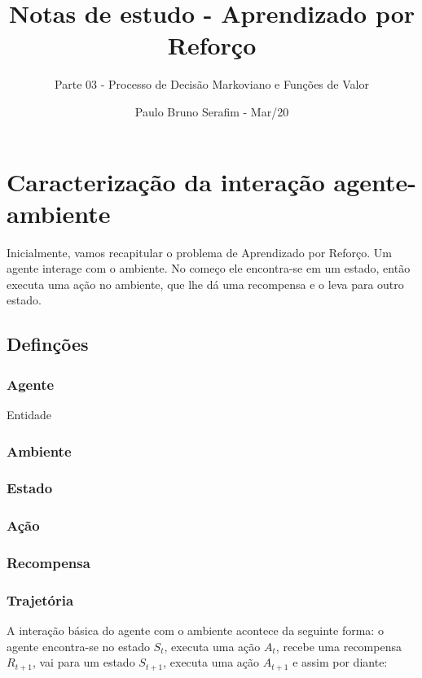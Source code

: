 \documentclass{article}
\title{Notas de estudo - Aprendizado por Reforço}
\author{Parte 03 - Processo de Decisão Markoviano e Funções de Valor}
\date{Paulo Bruno Serafim - Mar/20}
\begin{document}
\maketitle

    \section{Caracterização da interação agente-ambiente}
    
        Inicialmente, vamos recapitular o problema de Aprendizado por Reforço. Um agente interage com o ambiente. No começo ele encontra-se em um estado, então executa uma ação no ambiente, que lhe dá uma recompensa e o leva para outro estado. 
    
        \subsection{Definções}
            
            \subsubsection{Agente}
            
                Entidade 
            
            \subsubsection{Ambiente}
            
                
            
            \subsubsection{Estado}
            \subsubsection{Ação}
            \subsubsection{Recompensa}
            \subsubsection{Trajetória}
            
                A interação básica do agente com o ambiente acontece da seguinte forma: o agente encontra-se no estado $S_t$, executa uma ação $A_t$, recebe uma recompensa $R_{t+1}$, vai para um estado $S_{t+1}$, executa uma ação $A_{t+1}$ e assim por diante:
\end{document}

